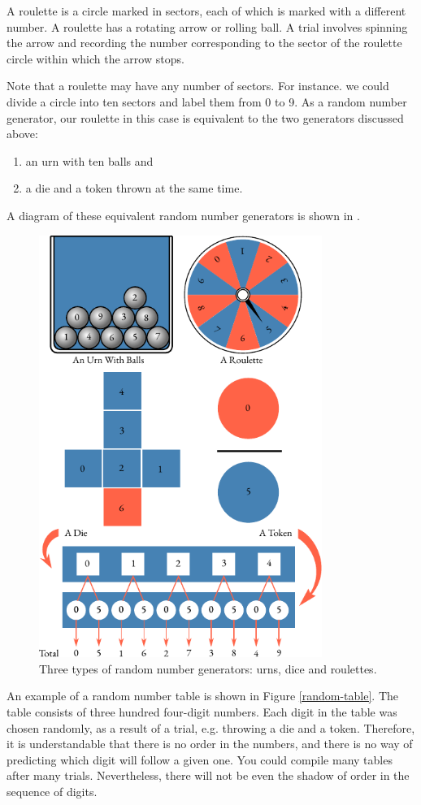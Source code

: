 A roulette is a circle marked in sectors, each of which is marked with
a different number. A roulette has a rotating arrow or rolling ball.
A trial involves spinning the arrow and recording the number
corresponding to the sector of the roulette circle within which the arrow
stops.

Note that a roulette may have any number of sectors. For instance.
we could divide a circle into ten sectors and label them from 0 to 9. As
a random number generator, our roulette in this case is equivalent to
the two generators discussed above: 
\begin{enumerate}[leftmargin=1cm,label=(\arabic*),noitemsep,nolistsep]
\item an urn with ten balls and
\item a die and a token thrown at the same time.
\end{enumerate}
A diagram of these equivalent random number generators is shown in .

\begin{figure}[!ht]
 \centering
 \includegraphics[width=0.82\textwidth]{figures/random-generators.pdf}
\caption{Three types of random number generators: urns, dice and roulettes.
\label{random-generators}}
 \end{figure}
{} An example of a random number table is
shown in Figure \ref{random-table}. The table consists of three hundred four-digit
numbers. Each digit in the table was chosen randomly, as a result of
a trial, e.g. throwing a die and a token. Therefore, it is understandable
that there is no order in the numbers, and there is no way of predicting
which digit will follow a given one. You could compile many tables after
many trials. Nevertheless, there will not be even the shadow of order in
the sequence of digits.

